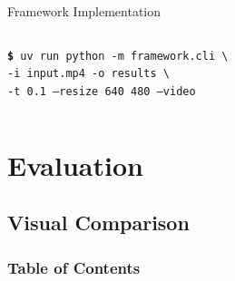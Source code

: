\documentclass[10pt,xcolor=x11names,compress]{beamer}
\begin{document}
\begin{frame}{Framework Implementation}
\begin{columns}[T]
    \scriptsize
    \texttt{\textbf{\$} uv run python -m framework.cli \textbackslash} \\
    \texttt{\hspace*{0.5cm}-i input.mp4 -o results \textbackslash} \\
    \texttt{\hspace*{0.5cm}-t 0.1 --resize 640 480 --video}

  \end{columns}

\end{frame}

\section{Evaluation}

\subsection{Visual Comparison}

\begin{frame}
  \frametitle{\textbf{Table of Contents}}
  \tableofcontents[
  hideallsubsections=false
  sectionstyle=show/shaded,    
  subsectionstyle=show/shaded/hide, 
  section=1-100                
  ]
\end{frame}
\end{document}
